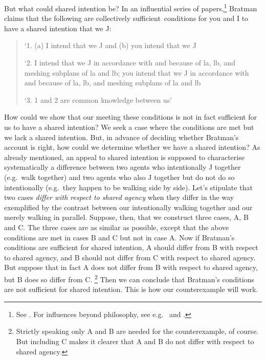 \documentclass[12pt,\papersize]{extarticle}
\begin{document}
But what could shared intention be?
In an influential series of papers,\footnote{ 
See \citet{Bratman:1992mi,Bratman:1993je,Bratman:1999fr,Bratman:2009lv}.
For influences beyond philosophy, see e.g.\ \citet{Tomasello:2005wx} and \citet{Knoblich:2008hy}. 
}
Bratman claims that the following are collectively sufficient\footnotemark \ conditions for you and I to have a shared intention that we J:
%
%
\begin{quote}
\label{quote:bratman_account}
`1. (a) I intend that we J and (b) you intend that we J
 
`2. I intend that we J in accordance with and because of la, lb, and meshing subplans of la and lb; you intend that we J in accordance with and because of la, lb, and meshing subplans of la and lb
 
`3. 1 and 2 are common knowledge between us' \citep[][p.\ View 4]{Bratman:1993je}
\end{quote}
%
How could we show that our meeting these conditions is not in fact sufficient for us to have a shared intention? 
We seek a case where the conditions are met but we lack a shared intention.
But, in advance of deciding whether Bratman's account is right, how could we determine whether we have a shared intention?
As already mentioned, an appeal to shared intention is supposed to  characterise systematically a difference between two agents who intentionally J together (e.g.\ walk  together) and two agents who also  J together but do not do so intentionally (e.g.\ they happen to be walking side by side). 
Let's stipulate that two cases \emph{differ with respect to shared agency} when they differ in the way exemplified by the contrast between our intentionally walking together and our merely walking in parallel.
Suppose, then, that we construct three cases, A, B and C.
The three cases are as similar as possible, except that the above conditions are met in cases B and C but not in case A.
Now if Bratman's conditions are sufficient for shared intention, A should differ from B with respect to shared agency, and B should not differ from C with respect to shared agency.
But suppose that in fact A does not differ from B with respect to shared agency, but B does so differ from C.%
\footnote{
Strictly speaking only A and B are needed for the counterexample, of course.
But including C makes it clearer that A and B do not differ with respect to shared agency.
}
Then we can conclude that Bratman's conditions are not sufficient for shared intention.
This is how our counterexample will work.
\end{document}
